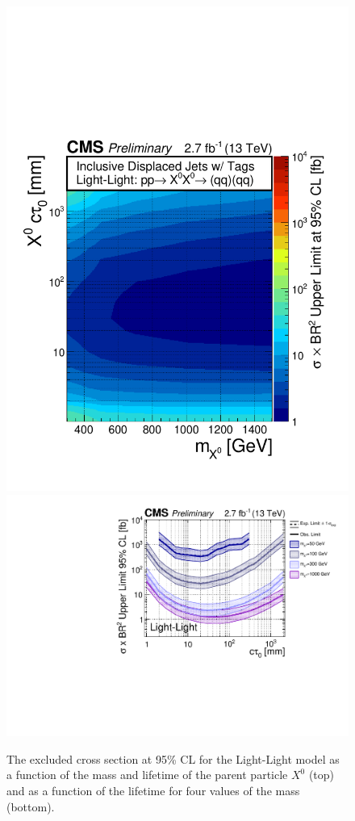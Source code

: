 \begin{figure}[tb]
\begin{center}
\includegraphics[width=.75\textwidth]{figures/pas//RESULT/UNBLINDED_LIMITS/Light-Light2D.pdf}
\includegraphics[width=.75\textwidth]{figures/pas//RESULT/UNBLINDED_LIMITS/Light-Light.pdf}
\caption{The excluded cross section at 95\% CL for the Light-Light
  model as a function of the mass and lifetime of the parent particle
  $X^0$ (top) and as a function of the lifetime for four values of the
  mass (bottom).\label{fig:light_limit}}
\end{center}
\end{figure}

